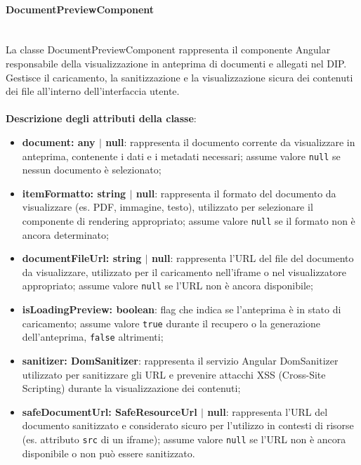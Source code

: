 \documentclass[a4paper,12pt]{article}
\begin{document}
{{{{                \paragraph{DocumentPreviewComponent}\label{par:DocumentPreviewComponent}\mbox{}\\
                La classe DocumentPreviewComponent rappresenta il componente Angular responsabile della visualizzazione in anteprima di documenti e allegati nel DIP. Gestisce il caricamento, la sanitizzazione e la visualizzazione sicura dei contenuti dei file all'interno dell'interfaccia utente.\\
                \\
                \textbf{Descrizione degli attributi della classe}:
                \begin{itemize}
                    \item \textbf{document: any $|$ null}: rappresenta il documento corrente da visualizzare in anteprima, contenente i dati e i metadati necessari; assume valore \texttt{null} se nessun documento è selezionato;
                    \item \textbf{itemFormatto: string $|$ null}: rappresenta il formato del documento da visualizzare (es. PDF, immagine, testo), utilizzato per selezionare il componente di rendering appropriato; assume valore \texttt{null} se il formato non è ancora determinato;
                    \item \textbf{documentFileUrl: string $|$ null}: rappresenta l'URL del file del documento da visualizzare, utilizzato per il caricamento nell'iframe o nel visualizzatore appropriato; assume valore \texttt{null} se l'URL non è ancora disponibile;
                    \item \textbf{isLoadingPreview: boolean}: flag che indica se l'anteprima è in stato di caricamento; assume valore \texttt{true} durante il recupero o la generazione dell'anteprima, \texttt{false} altrimenti;
                    \item \textbf{sanitizer: DomSanitizer}: rappresenta il servizio Angular DomSanitizer utilizzato per sanitizzare gli URL e prevenire attacchi XSS (Cross-Site Scripting) durante la visualizzazione dei contenuti;
                    \item \textbf{safeDocumentUrl: SafeResourceUrl $|$ null}: rappresenta l'URL del documento sanitizzato e considerato sicuro per l'utilizzo in contesti di risorse (es. attributo \texttt{src} di un iframe); assume valore \texttt{null} se l'URL non è ancora disponibile o non può essere sanitizzato.
                \end{itemize}
                
}}}}
\end{document}
